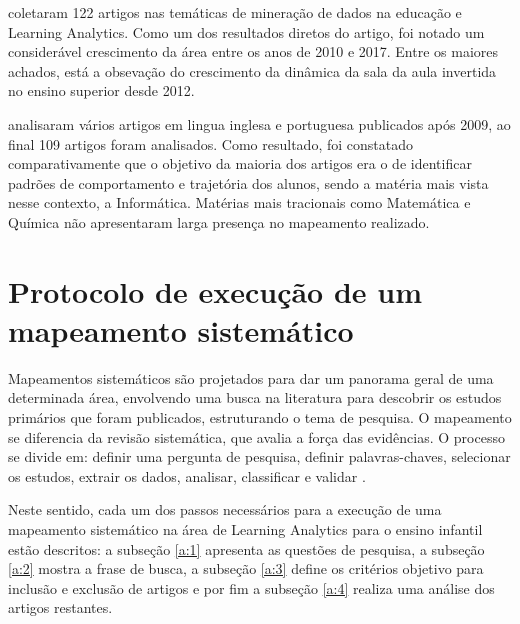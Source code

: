 \documentclass[12pt]{article}
\begin{document}
 coletaram  122 artigos nas temáticas de mineração de dados na educação e Learning Analytics. Como um dos resultados diretos do artigo, foi notado um considerável crescimento da área entre os anos de 2010 e 2017. Entre os maiores achados, está a obsevação do crescimento da dinâmica da sala da aula invertida no ensino superior desde 2012.

 analisaram vários artigos em lingua inglesa e portuguesa publicados após 2009, ao final 109 artigos foram analisados. Como resultado, foi constatado comparativamente que o objetivo da maioria dos artigos era o de identificar padrões de comportamento e trajetória dos alunos, sendo a matéria mais vista nesse contexto, a Informática. Matérias mais tracionais como  Matemática e Química não apresentaram larga presença no mapeamento realizado.


\section{Protocolo de execução de um mapeamento sistemático}\label{secao:infancia}

Mapeamentos sistemáticos são projetados para dar um panorama geral de uma determinada área, envolvendo uma busca na literatura para descobrir os estudos primários que foram publicados, estruturando o tema de pesquisa. O mapeamento se diferencia da revisão sistemática, que avalia a força das evidências. O processo se divide em: definir uma pergunta de pesquisa, definir palavras-chaves, selecionar os estudos, extrair os dados, analisar, classificar e validar \cite{carniel2017mapeamento}. 

Neste sentido, cada um dos passos necessários para a execução de uma mapeamento sistemático na área de Learning Analytics para o ensino infantil estão descritos: a subseção \ref{a:1} apresenta as questões de pesquisa, a subseção \ref{a:2} mostra a frase de busca, a subseção \ref{a:3} define os critérios objetivo para inclusão e exclusão de artigos e por fim a subseção \ref{a:4} realiza uma análise dos artigos restantes.


\newpage
\end{document}

